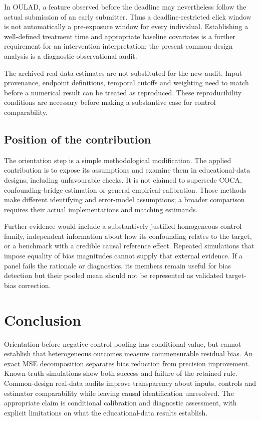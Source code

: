 In OULAD, a feature observed before the deadline may nevertheless follow the actual submission of an early submitter. Thus a deadline-restricted click window is not automatically a pre-exposure window for every individual. Establishing a well-defined treatment time and appropriate baseline covariates is a further requirement for an intervention interpretation; the present common-design analysis is a diagnostic observational audit.

The archived real-data estimates are not substituted for the new audit. Input provenance, endpoint definitions, temporal cutoffs and weighting need to match before a numerical result can be treated as reproduced. These reproducibility conditions are necessary before making a substantive case for control comparability.

\subsection{Position of the contribution}

The orientation step is a simple methodological modification. The applied contribution is to expose its assumptions and examine them in educational-data designs, including unfavourable checks. It is not claimed to supersede COCA, confounding-bridge estimation or general empirical calibration. Those methods make different identifying and error-model assumptions; a broader comparison requires their actual implementations and matching estimands.

Further evidence would include a substantively justified homogeneous control family, independent information about how its confounding relates to the target, or a benchmark with a credible causal reference effect. Repeated simulations that impose equality of bias magnitudes cannot supply that external evidence. If a panel fails the rationale or diagnostics, its members remain useful for bias detection but their pooled mean should not be represented as validated target-bias correction.

\section{Conclusion}

Orientation before negative-control pooling has conditional value, but cannot establish that heterogeneous outcomes measure commensurable residual bias. An exact MSE decomposition separates bias reduction from precision improvement. Known-truth simulations show both success and failure of the retained rule. Common-design real-data audits improve transparency about inputs, controls and estimator comparability while leaving causal identification unresolved. The appropriate claim is conditional calibration and diagnostic assessment, with explicit limitations on what the educational-data results establish.

